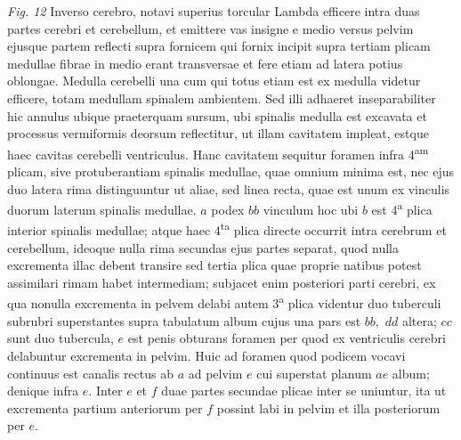 \centering \lbrack\textit{Fig. 12}\rbrack
\pend
\vspace{1.5em}
\pstart
Inverso cerebro, notavi superius torcular Lambda efficere intra duas partes cerebri et cerebellum,
et emittere vas insigne e medio versus pelvim ejusque partem reflecti supra fornicem qui fornix incipit supra tertiam plicam medullae
fibrae in medio erant transversae et fere etiam ad latera
 potius oblongae.
Medulla cerebelli una cum
qui totus etiam est ex medulla videtur 
efficere, totam medullam spinalem ambientem.
Sed illi adhaeret inseparabiliter hic annulus ubique praeterquam sursum, ubi spinalis medulla est excavata et processus vermiformis deorsum reflectitur,
ut illam cavitatem impleat, estque haec cavitas cerebelli ventriculus.
Hanc cavitatem sequitur foramen infra 4\textsuperscript{am} plicam,
sive protuberantiam spinalis medullae, quae omnium minima est,
nec ejus duo latera rima distinguuntur ut aliae, sed linea recta,
quae est unum ex vinculis duorum laterum spinalis medullae.
$a$ podex $bb$ vinculum hoc ubi $b$ est 4\textsuperscript{a} plica interior spinalis medullae;
atque haec 4\textsuperscript{ta} plica directe occurrit intra cerebrum et cerebellum,
ideoque nulla rima secundas ejus partes separat,
quod nulla excrementa illac debent transire sed tertia plica quae proprie natibus potest assimilari rimam habet intermediam;
subjacet enim posteriori parti cerebri, ex qua nonulla excrementa in pelvem delabi
autem 3\textsuperscript{a} plica videntur duo tuberculi subrubri superstantes supra tabulatum album
cujus una pars est $bb,$ $dd$ altera; $cc$ sunt duo tubercula, $e$ est penis obturans foramen
per quod ex ventriculis cerebri delabuntur excrementa in pelvim.
Huic ad foramen quod podicem vocavi continuus est canalis rectus ab $a$ ad pelvim $e$ cui superstat planum $ae$ album;
denique infra $e.$
Inter $e$ et $f$ duae partes secundae plicae inter se uniuntur, ita ut excrementa partium anteriorum per $f$ possint labi in pelvim et illa posteriorum per $e.$
\pend%
\pstart%
